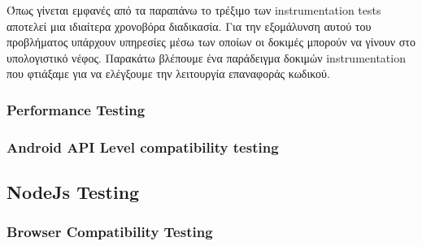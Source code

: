 		Όπως γίνεται εμφανές από τα παραπάνω το τρέξιμο των instrumentation tests αποτελεί μια ιδιαίτερα χρονοβόρα διαδικασία. Για την εξομάλυνση αυτού του προβλήματος υπάρχουν υπηρεσίες μέσω των οποίων οι δοκιμές μπορούν να γίνουν στο υπολογιστικό νέφος. Παρακάτω βλέπουμε ένα παράδειγμα δοκιμών instrumentation που φτιάξαμε για να ελέγξουμε την λειτουργία επαναφοράς κωδικού.
		
		
		
		\subsubsection{Performance Testing}
		\subsubsection{Android API Level compatibility testing}
		\subsection{NodeJs Testing}
		
		\subsubsection{Browser Compatibility Testing}

